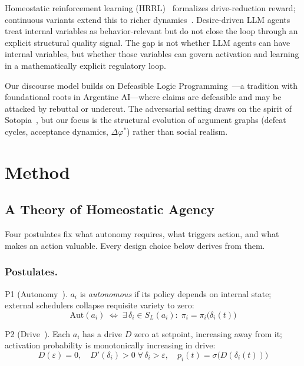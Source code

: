 \documentclass{llncs}
\begin{document}
Homeostatic reinforcement learning (HRRL)~\parencite{keramati2014homeostatic}
formalizes drive-reduction reward; continuous variants extend this to richer
dynamics~\parencite{laurencon2024ctcs}. Desire-driven LLM
agents~\parencite{wang2025d2a} treat internal variables as behavior-relevant
but do not close the loop through an explicit structural quality signal.
The gap is not whether LLM agents can have internal variables, but whether
those variables can govern activation and learning in a mathematically
explicit regulatory loop.

Our discourse model builds on Defeasible Logic
Programming~\parencite{simari1992mathematical,chesnevar2000logically,garcia2004defeasible}---a
tradition with foundational roots in Argentine AI---where claims are
defeasible and may be attacked by rebuttal or undercut. The adversarial
setting draws on the spirit of Sotopia~\parencite{zhou2024sotopia}, but our
focus is the structural evolution of argument graphs (defeat cycles,
acceptance dynamics, $\Delta\varphi^*$) rather than social realism.

\section{Method}
\label{sec:method}

\subsection{A Theory of Homeostatic Agency}
\label{sec:theory}

Four postulates fix what autonomy requires, what triggers action, and what
makes an action valuable.  Every design choice below derives from them.

\subsubsection{Postulates.}

\noindent\textsc{P1} (Autonomy~\parencite{ashby1956introduction,beer1972brain}).
$a_i$ is \emph{autonomous} if its policy depends on internal state;
external schedulers collapse requisite variety to zero:
\begin{equation}
    \mathrm{Aut}(a_i) \;\iff\; \exists\,\delta_i \in S_L(a_i):\;
    \pi_i = \pi_i\!\bigl(\delta_i(t)\bigr)
    \label{eq:a1}
\end{equation}

\noindent\textsc{P2} (Drive~\parencite{sterling1988allostasis,friston2010free}).
Each $a_i$ has a drive $D$ zero at setpoint, increasing away from it;
activation probability is monotonically increasing in drive:
\begin{equation}
    D(\varepsilon)=0,\quad D'(\delta_i)>0 \;\forall\,\delta_i>\varepsilon,
    \quad p_i(t)=\sigma\!\bigl(D(\delta_i(t))\bigr)
    \label{eq:a2}
\end{equation}
\end{document}
